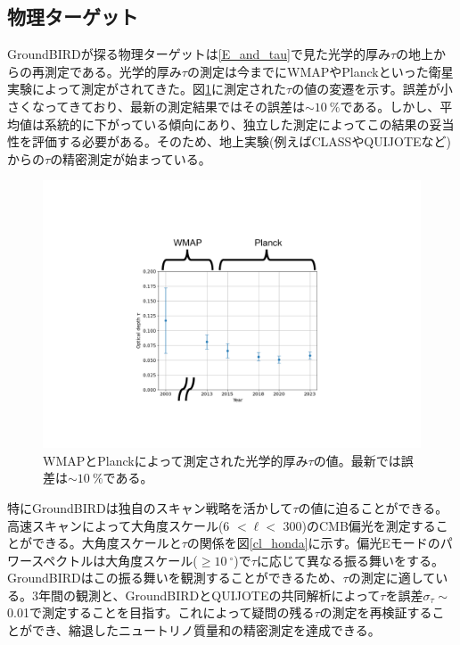 \subsection{物理ターゲット}
GroundBIRDが探る物理ターゲットは\ref{E_and_tau}で見た光学的厚み$\tau$の地上からの再測定である。光学的厚み$\tau$の測定は今までにWMAPやPlanckといった衛星実験によって測定がされてきた。図\ref{tau_planck}に測定された$\tau$の値の変遷を示す。誤差が小さくなってきており、最新の測定結果ではその誤差は$\sim\SI{10}{\%}$である。しかし、平均値は系統的に下がっている傾向にあり、独立した測定によってこの結果の妥当性を評価する必要がある。そのため、地上実験(例えばCLASS\cite{CLASS}やQUIJOTE\cite{QUIJOTE}など)からの$\tau$の精密測定が始まっている。

\begin{figure}[htbp]
  \centering
  \includegraphics[width=0.8\columnwidth]{3_GB/figs/tau_planck_wmap_mod.pdf}
  \caption{WMAPとPlanckによって測定された光学的厚み$\tau$の値\cite{tau_measure}。最新では誤差は$\sim\SI{10}{\%}$である。}
  \label{tau_planck}
\end{figure}

特にGroundBIRDは独自のスキャン戦略を活かして$\tau$の値に迫ることができる。高速スキャンによって大角度スケール(6 $<\ell<$ 300)のCMB偏光を測定することができる。大角度スケールと$\tau$の関係を図\ref{cl_honda}に示す。偏光Eモードのパワースペクトルは大角度スケール($\geq\SI{10}{^{\circ}}$)で$\tau$に応じて異なる振る舞いをする。GroundBIRDはこの振る舞いを観測することができるため、$\tau$の測定に適している。3年間の観測と、GroundBIRDとQUIJOTEの共同解析によって$\tau$を誤差$\sigma_{\tau}\sim$ 0.01で測定することを目指す\cite{joint_ana}。これによって疑問の残る$\tau$の測定を再検証することができ、縮退したニュートリノ質量和の精密測定を達成できる。

